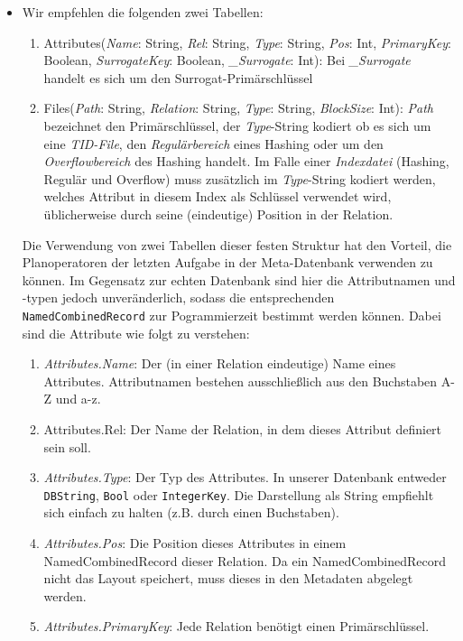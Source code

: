 \begin{itemize}
	\item Wir empfehlen die folgenden zwei Tabellen: 
\begin{enumerate}
\item Attributes(\textit{Name}: String, \textit{Rel}: String, \textit{Type}: String, \textit{Pos}: Int, \textit{PrimaryKey}: Boolean, \textit{SurrogateKey}: Boolean, \textit{\_Surrogate}: Int): Bei \textit{\_Surrogate} handelt es sich um den Surrogat-Primärschlüssel
\item Files(\textit{Path}: String, \textit{Relation}: String, \textit{Type}: String, \textit{BlockSize}: Int):
\textit{Path} bezeichnet den Primärschlüssel, der \textit{Type}-String kodiert ob es sich um eine \textit{TID-File}, den \textit{Regulärbereich} eines Hashing oder um den \textit{Overflowbereich} des Hashing handelt.
Im Falle einer \textit{Indexdatei} (Hashing, Regulär und Overflow) muss zusätzlich im \textit{Type}-String kodiert werden, welches Attribut in diesem Index als Schlüssel verwendet wird, üblicherweise durch seine (eindeutige) Position in der Relation.
\end{enumerate}
Die Verwendung von zwei Tabellen dieser festen Struktur hat den Vorteil, die Planoperatoren der letzten Aufgabe in der Meta-Datenbank verwenden zu können.
		Im Gegensatz zur echten Datenbank sind hier die Attributnamen und -typen jedoch unveränderlich, sodass die entsprechenden \texttt{NamedCombinedRecord} zur Pogrammierzeit bestimmt werden können.
		Dabei sind die Attribute wie folgt zu verstehen:
		\begin{enumerate}
			\item \textit{Attributes.Name}: Der (in einer Relation eindeutige) Name eines Attributes. Attributnamen bestehen ausschließlich aus den Buchstaben A-Z und a-z.
			\item Attributes.Rel: Der Name der Relation, in dem dieses Attribut definiert sein soll.
			\item \textit{Attributes.Type}: Der Typ des Attributes. In unserer Datenbank entweder \texttt{DBString}, \texttt{Bool} oder \texttt{IntegerKey}. Die Darstellung als String empfiehlt sich einfach zu halten (z.B. durch einen Buchstaben).
			\item \textit{Attributes.Pos}: Die Position dieses Attributes in einem \mbox{NamedCombinedRecord} dieser Relation. Da ein \mbox{NamedCombinedRecord} nicht das Layout speichert, muss dieses in den Metadaten abgelegt werden.
			\item \textit{Attributes.PrimaryKey}: Jede Relation benötigt einen Primärschlüssel.

\end{enumerate}
\end{itemize}
